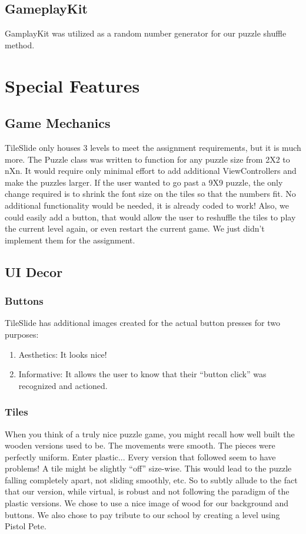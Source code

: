 \documentclass [10pt] {article}
\begin{document}
\subsection{GameplayKit}
GamplayKit was utilized as a random number generator for our puzzle shuffle method.

\section{Special Features}

\subsection{Game Mechanics}
TileSlide only houses 3 levels to meet the assignment requirements, but it is much more.  The Puzzle class was written to function for any puzzle size from 2X2 to nXn. It would require only minimal effort to add additional ViewControllers and make the puzzles larger.  If the user wanted to go past a 9X9 puzzle, the only change required is to shrink the font size on the tiles so that the numbers fit.  No additional functionality would be needed, it is already coded to work!  Also, we could easily add a button, that would allow the user to reshuffle the tiles to play the current level again, or even restart the current game.  We just didn't implement them for the assignment.

\subsection{UI Decor}
\subsubsection{Buttons}
TileSlide has additional images created for the actual button presses for two purposes:
\begin{enumerate}
\item Aesthetics:  It looks nice!
\item Informative:  It allows the user to know that their ``button click'' was recognized and actioned.
\end{enumerate}
\subsubsection{Tiles}
When you think of a truly nice puzzle game, you might recall how well built the wooden versions used to be.  The movements were smooth.  The pieces were perfectly uniform. Enter plastic... Every version that followed seem to have problems!  A tile might be slightly ``off'' size-wise.  This would lead to the puzzle falling completely apart, not sliding smoothly, etc.  So to subtly allude to the fact that our version, while virtual, is robust and not following the paradigm of the plastic versions.  We chose to use a nice image of wood for our background and buttons.  We also chose to pay tribute to our school by creating a level using Pistol Pete.
\end{document}
